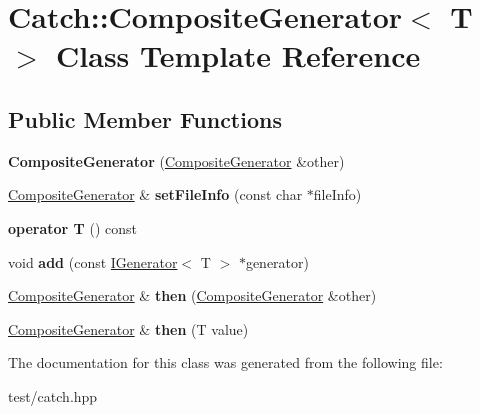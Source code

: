 \hypertarget{classCatch_1_1CompositeGenerator}{}\section{Catch\+:\+:Composite\+Generator$<$ T $>$ Class Template Reference}
\label{classCatch_1_1CompositeGenerator}
\subsection*{Public Member Functions}
\begin{DoxyCompactItemize}
\item 
{\bfseries Composite\+Generator} (\hyperlink{classCatch_1_1CompositeGenerator}{Composite\+Generator} \&other)\hypertarget{classCatch_1_1CompositeGenerator_a21a7070a00e4a6fe021294c356692692}{}\label{classCatch_1_1CompositeGenerator_a21a7070a00e4a6fe021294c356692692}

\item 
\hyperlink{classCatch_1_1CompositeGenerator}{Composite\+Generator} \& {\bfseries set\+File\+Info} (const char $\ast$file\+Info)\hypertarget{classCatch_1_1CompositeGenerator_ac3c57cf4ca5472f440bf71e2936bcd4a}{}\label{classCatch_1_1CompositeGenerator_ac3c57cf4ca5472f440bf71e2936bcd4a}

\item 
{\bfseries operator T} () const \hypertarget{classCatch_1_1CompositeGenerator_aa3f627d84fb256df0404d19d7fd4b784}{}\label{classCatch_1_1CompositeGenerator_aa3f627d84fb256df0404d19d7fd4b784}

\item 
void {\bfseries add} (const \hyperlink{structCatch_1_1IGenerator}{I\+Generator}$<$ T $>$ $\ast$generator)\hypertarget{classCatch_1_1CompositeGenerator_af3774d42ad2d3453d089ca599efe0517}{}\label{classCatch_1_1CompositeGenerator_af3774d42ad2d3453d089ca599efe0517}

\item 
\hyperlink{classCatch_1_1CompositeGenerator}{Composite\+Generator} \& {\bfseries then} (\hyperlink{classCatch_1_1CompositeGenerator}{Composite\+Generator} \&other)\hypertarget{classCatch_1_1CompositeGenerator_a2e03f42df85cdd238aabd77a80b075d5}{}\label{classCatch_1_1CompositeGenerator_a2e03f42df85cdd238aabd77a80b075d5}

\item 
\hyperlink{classCatch_1_1CompositeGenerator}{Composite\+Generator} \& {\bfseries then} (T value)\hypertarget{classCatch_1_1CompositeGenerator_aefdc11bcfccdf07d2db5f0da3ed8758c}{}\label{classCatch_1_1CompositeGenerator_aefdc11bcfccdf07d2db5f0da3ed8758c}

\end{DoxyCompactItemize}


The documentation for this class was generated from the following file\+:\begin{DoxyCompactItemize}
\item 
test/catch.\+hpp\end{DoxyCompactItemize}
